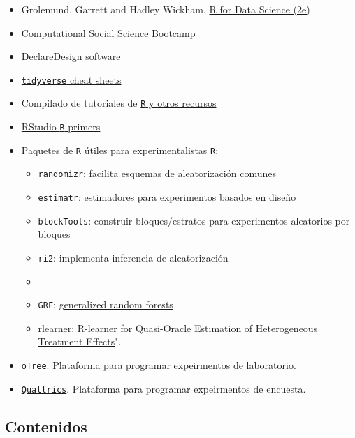\documentclass[
  12pt,
]{article}
\providecommand{\tightlist}{%
  \setlength{\itemsep}{0pt}\setlength{\parskip}{0pt}}
\begin{document}
\begin{itemize}
\tightlist
\item
  Grolemund, Garrett and Hadley Wickham.
  \href{https://r4ds.hadley.nz/}{R for Data Science (2e)}
\item
  \href{https://sicss.io/boot_camp/}{Computational Social Science
  Bootcamp}
\item
  \href{https://declaredesign.org/getting-started/}{DeclareDesign}
  software
\item
  \href{https://posit.co/resources/cheatsheets/}{\texttt{tidyverse}
  cheat sheets}
\item
  Compilado de tutoriales de
  \href{https://github.com/Chris-Engelhardt/data_sci_guide/}{\texttt{R}
  y otros recursos}
\item
  \href{https://posit.cloud/learn/primers}{RStudio \texttt{R} primers}
\item
  Paquetes de \texttt{R} útiles para experimentalistas \texttt{R}:

  \begin{itemize}
  \tightlist
  \item
    \texttt{randomizr}: facilita esquemas de aleatorización comunes
  \item
    \texttt{estimatr}: estimadores para experimentos basados en diseño
  \item
    \texttt{blockTools}: construir bloques/estratos para experimentos
    aleatorios por bloques
  \item
    \texttt{ri2}: implementa inferencia de aleatorización
  \item
  \item
    \texttt{GRF}: \href{https://grf-labs.github.io/grf/}{generalized
    random forests}
  \item
    rlearner: \href{https://github.com/xnie/rlearner}{R-learner for
    Quasi-Oracle Estimation of Heterogeneous Treatment Effects}".
  \end{itemize}
\item
  \href{https://www.otree.org/}{\texttt{oTree}}. Plataforma para
  programar expeirmentos de laboratorio.
\item
  \href{https://www.qualtrics.com/}{\texttt{Qualtrics}}. Plataforma para
  programar expeirmentos de encuesta.
\end{itemize}

\hypertarget{contenidos}{%
\subsection{Contenidos}\label{contenidos}}
\end{document}
